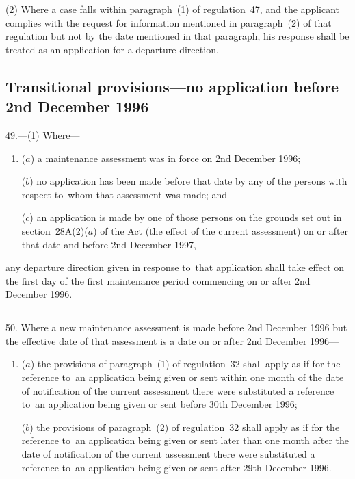 \documentclass[12pt,a4paper]{article}
\begin{document}
(2) Where a case falls within paragraph~(1) of regulation~47, and the applicant
complies with the request for information mentioned in paragraph~(2) of that
regulation but not by the date mentioned in that paragraph, his response shall
be treated as an application for a departure direction.

\subsection[49. Transitional provisions—no application before 2nd December 1996]{Transitional provisions—no application before 2nd December 1996}

49.—(1) Where—
\begin{enumerate}\item[]
($a$) a maintenance assessment was in force on 2nd December 1996;

($b$) no application has been made before that date by any of the persons with
respect to~whom that assessment was made; and

($c$) an application is made by one of those persons on the grounds set out in
section~28A(2)($a$) of the Act (the effect of the current assessment) on or after
that date and before 2nd December 1997,
\end{enumerate}
any departure direction given in response to~that application shall take effect
on the first day of the first maintenance period commencing on or after 2nd
December 1996.

\subsection[50. Transitional provisions—new maintenance assessment made before 2nd December 1996 whose effective date is on or after 2nd December 1996]{}

50. Where a new maintenance assessment is made before 2nd December 1996 but the effective date of that assessment is a date on or after 2nd December 1996—
\begin{enumerate}\item[]
($a$) the provisions of paragraph~(1) of regulation~32 shall apply as if for the reference to~an application being given or sent within 
one month  %
of the date of notification of the current assessment there were substituted a reference to~an application being given or sent before 30th December 1996;

($b$) the provisions of paragraph~(2) of regulation~32 shall apply as if for the reference to~an application being given or sent later than 
one month  %
after the date of notification of the current assessment there were substituted a reference to~an application being given or sent after 29th December 1996.
\end{enumerate}
\end{document}
